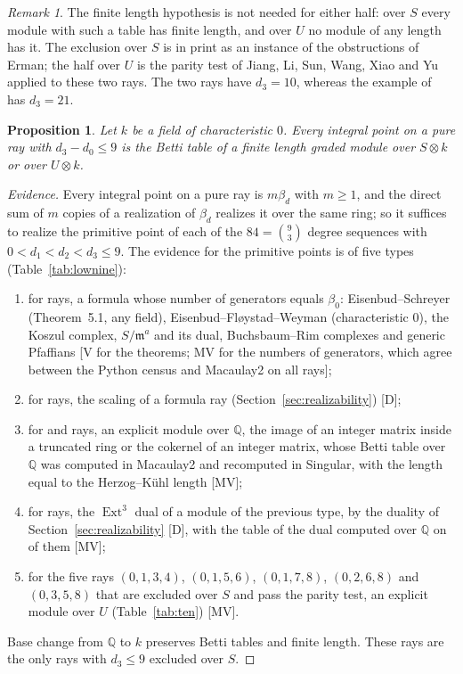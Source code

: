 \documentclass[11pt]{article}
\newtheorem{proposition}{Proposition}
\theoremstyle{definition}
\theoremstyle{remark}
\newtheorem{remark}{Remark}
\newcommand{\Q}{\mathbb{Q}}
\newcommand{\Ext}{\operatorname{Ext}}
\begin{document}
\begin{remark}
The finite length hypothesis is not needed for either half: over $S$ every module with such a table has finite length, and over $U$ no module of any length has it. The exclusion over $S$ is in print as an instance of the obstructions of Erman; the half over $U$ is the parity test of Jiang, Li, Sun, Wang, Xiao and Yu applied to these two rays. The two rays have $d_3=10$, whereas the example of~\cite{JLSWXY} has $d_3=21$.
\end{remark}

\begin{proposition}\label{prop:lownine}
Let $k$ be a field of characteristic $0$. Every integral point on a pure ray with $d_3-d_0\le9$ is the Betti table of a finite length graded module over $S\otimes k$ or over $U\otimes k$.
\end{proposition}
\begin{proof}[Evidence]
Every integral point on a pure ray is $m\beta_d$ with $m\ge1$, and the direct sum of $m$ copies of a realization of $\beta_d$ realizes it over the same ring; so it suffices to realize the primitive point of each of the $84=\binom93$ degree sequences with $0<d_1<d_2<d_3\le9$. The evidence for the primitive points is of five types (Table~\ref{tab:lownine}):
\begin{enumerate}
\item for \nlowNineFormula{} rays, a formula whose number of generators equals $\beta_0$: Eisenbud--Schreyer (Theorem~5.1, any field), Eisenbud--Fl{\o}ystad--Weyman (characteristic $0$), the Koszul complex, $S/\mathfrak m^a$ and its dual, Buchsbaum--Rim complexes and generic Pfaffians [V for the theorems; MV for the numbers of generators, which agree between the Python census and Macaulay2 on all \nrays{} rays];
\item for \nlowNineScaling{} rays, the scaling of a formula ray (Section~\ref{sec:realizability}) [D];
\item for \nlowNineSocle{} and \nlowNineModule{} rays, an explicit module over $\Q$, the image of an integer matrix inside a truncated ring or the cokernel of an integer matrix, whose Betti table over $\Q$ was computed in Macaulay2 and recomputed in Singular, with the length equal to the Herzog--K\"uhl length [MV];
\item for \nlowNineDual{} rays, the $\Ext^3$ dual of a module of the previous type, by the duality of Section~\ref{sec:realizability} [D], with the table of the dual computed over $\Q$ on \nqqDualsDirect{} of them [MV];
\item for the five rays $(0,1,3,4)$, $(0,1,5,6)$, $(0,1,7,8)$, $(0,2,6,8)$ and $(0,3,5,8)$ that are excluded over $S$ and pass the parity test, an explicit module over $U$ (Table~\ref{tab:ten}) [MV].
\end{enumerate}
Base change from $\Q$ to $k$ preserves Betti tables and finite length. These \nlowNineExcluded{} rays are the only rays with $d_3\le9$ excluded over $S$. \qedhere
\end{proof}
\FloatBarrier
\end{document}
